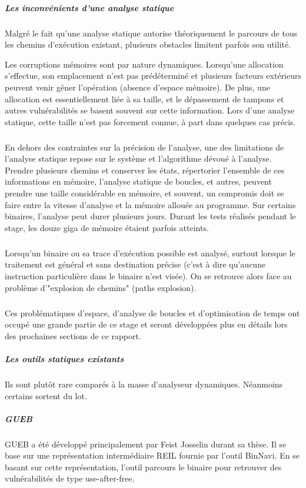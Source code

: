 \subparagraph{Les inconvénients d'une analyse statique}

Malgré le fait qu'une analyse statique autorise théoriquement le parcours de tous les chemins d'exécution existant, plusieurs obstacles
limitent parfois son utilité.\newline

Les corruptions mémoires sont par nature dynamiques. Lorsqu'une allocation s'effectue, son emplacement n'est pas prédéterminé
et plusieurs facteurs extérieurs peuvent venir gêner l'opération (absence d'espace mémoire). De plus, une allocation
est essentiellement liée à sa taille, et le dépassement de tampons et autres vulnérabilités se basent souvent sur cette information.
Lors d'une analyse statique, cette taille n'est pas forcement connue, à part dans quelques cas précis.
\subparagraph{}

En dehors des contraintes sur la précision de l'analyse, une des limitations de l'analyse statique repose sur le système et l'algorithme
dévoué à l'analyse. Prendre plusieurs chemins et conserver les états, répertorier l'ensemble de ces informations en mémoire, l'analyse
statique de boucles, et autres, peuvent prendre une taille considérable en mémoire, et souvent, un compromis doit se faire entre la vitesse
d'analyse et la mémoire allouée au programme. Sur certains binaires, l'analyse peut durer plusieurs jours. Durant les tests réalisés pendant le
stage, les douze giga de mémoire étaient parfois atteints.

\subparagraph{}
Lorsqu'un binaire ou sa trace d'exécution possible est analysé, surtout lorsque le traitement est général et sans destination précise (c'est à dire
qu'aucune instruction particulière dans le binaire n'est visée). On se retrouve alors face au problème d'"explosion de chemins" (paths explosion).

\subparagraph{}
Ces problématiques d'espace, d'analyse de boucles et d'optimisation de temps ont occupé une grande partie de ce stage et seront développées plus
en détails lors des prochaines sections de ce rapport.

\subparagraph{Les outils statiques existants}
Ils sont plutôt rare comparés à la masse d'analyseur dynamiques. Néanmoins certains sortent du lot.

\subparagraph{GUEB}
GUEB a été développé principalement par Feist Josselin durant sa thèse. Il se base sur une représentation intermédiaire
REIL fournie par l'outil BinNavi. En se basant sur cette représentation, l'outil parcours le binaire pour retrouver des vulnérabilités
de type use-after-free.

